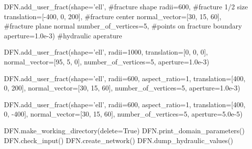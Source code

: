 \documentclass{beamer}
\newcommand\bluecomment[1]{{{\color{blue} #1}}}
\begin{document}
\begin{frame}
\begin{semiverbatim}
		DFN.add_user_fract(shape='ell', \bluecomment{#fracture shape}
		  radii=600,                    \bluecomment{#fracture 1/2 size}
		  translation=[-400, 0, 200],      \bluecomment{#fracture center}
		  normal_vector=[30, 15, 60],      \bluecomment{#fracture plane normal}
		  number_of_vertices=5,     \bluecomment{#points on fracture boundary}
		  aperture=1.0e-3)      \bluecomment{#hydraulic aperature}   
					
		DFN.add_user_fract(shape='ell',
		  radii=1000,
		  translation=[0, 0, 0],
		  normal_vector=[95, 5, 0],
		  number_of_vertices=5,
		  aperture=1.0e-3)
		
		
		
		
		
		DFN.add_user_fract(shape='ell',
		  radii=600,
		  aspect_ratio=1,
		  translation=[400, 0, 200],
		  normal_vector=[30, 15, 60],
		  number_of_vertices=5,
		  aperture=1.0e-3)
		
		DFN.add_user_fract(shape='ell',
		  radii=600,
		  aspect_ratio=1,
		  translation=[400, 0, -400],
		  normal_vector=[30, 15, 60],
		  number_of_vertices=5,
		  aperture=5.0e-5)
		
		
		
		
		DFN.make_working_directory(delete=True)
		DFN.print_domain_parameters()
		DFN.check_input()
		DFN.create_network()
		DFN.dump_hydraulic_values()
		
	\end{semiverbatim}
\end{frame}
\end{document}

